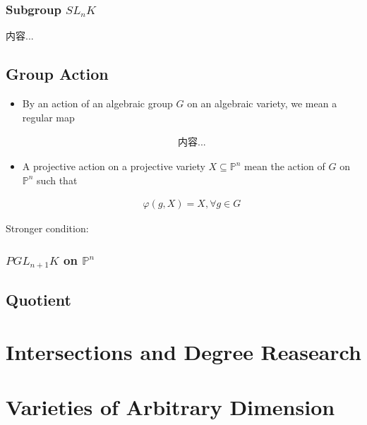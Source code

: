 \documentclass[Total.tex]{subfiles}
\begin{document}
		\subsection{Subgroup $SL_nK$}
		
		\begin{Def}
			内容...
		\end{Def}
		
		\section{Group Action}
		
			\begin{Def}
				\begin{itemize}
					\item By an action of an algebraic group $G$ on an algebraic variety, we mean a regular map
					
					\begin{gather*}
						内容...
					\end{gather*}
					
					\item A projective action on a projective variety $X\subseteq \mathbb{P}^n$ mean the action of $G$ on $\mathbb{P}^n$ such that
					
					\begin{gather*}
						\varphi(g,X)=X,\forall g\in G
					\end{gather*}
				\end{itemize}
			\end{Def}
			
			Stronger condition:
			
			\subsection{$PGL_{n+1}K$ on $\mathbb{P}^n$}
		
		\section{Quotient}
		
	\chapter{Intersections and Degree Reasearch}

	
	\chapter{Varieties of Arbitrary Dimension}
\end{document}
